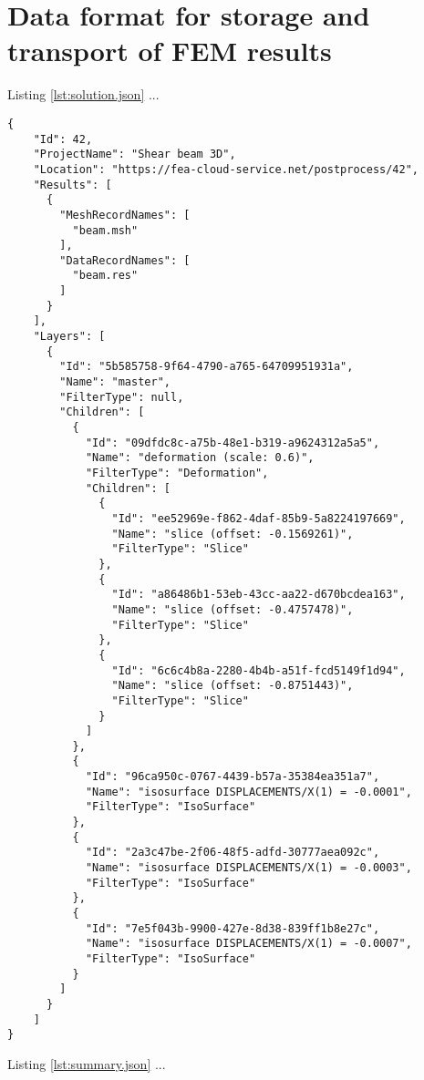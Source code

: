 \chapter{Data format for storage and transport of FEM results}
\label{appendix:data-format}



Listing \ref{lst:solution.json} ...

\begin{lstlisting}[style=json,caption=Example of solution.json document,label=lst:solution.json]
{
    "Id": 42,
    "ProjectName": "Shear beam 3D",
    "Location": "https://fea-cloud-service.net/postprocess/42",
    "Results": [
      {
        "MeshRecordNames": [
          "beam.msh"
        ],
        "DataRecordNames": [
          "beam.res"
        ]
      }
    ],
    "Layers": [
      {
        "Id": "5b585758-9f64-4790-a765-64709951931a",
        "Name": "master",
        "FilterType": null,
        "Children": [
          {
            "Id": "09dfdc8c-a75b-48e1-b319-a9624312a5a5",
            "Name": "deformation (scale: 0.6)",
            "FilterType": "Deformation",
            "Children": [
              {
                "Id": "ee52969e-f862-4daf-85b9-5a8224197669",
                "Name": "slice (offset: -0.1569261)",
                "FilterType": "Slice"
              },
              {
                "Id": "a86486b1-53eb-43cc-aa22-d670bcdea163",
                "Name": "slice (offset: -0.4757478)",
                "FilterType": "Slice"
              },
              {
                "Id": "6c6c4b8a-2280-4b4b-a51f-fcd5149f1d94",
                "Name": "slice (offset: -0.8751443)",
                "FilterType": "Slice"
              }
            ]
          },
          {
            "Id": "96ca950c-0767-4439-b57a-35384ea351a7",
            "Name": "isosurface DISPLACEMENTS/X(1) = -0.0001",
            "FilterType": "IsoSurface"
          },
          {
            "Id": "2a3c47be-2f06-48f5-adfd-30777aea092c",
            "Name": "isosurface DISPLACEMENTS/X(1) = -0.0003",
            "FilterType": "IsoSurface"
          },
          {
            "Id": "7e5f043b-9900-427e-8d38-839ff1b8e27c",
            "Name": "isosurface DISPLACEMENTS/X(1) = -0.0007",
            "FilterType": "IsoSurface"
          }
        ]
      }
    ]
}
\end{lstlisting}

Listing \ref{lst:summary.json} ...

